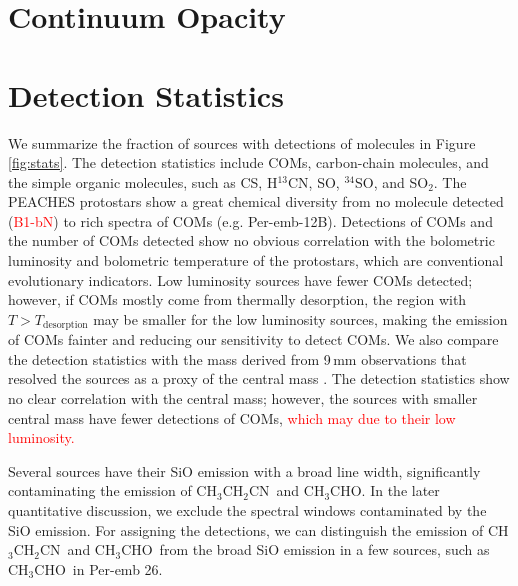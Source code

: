 \documentclass[twocolumn]{aastex62}
\newcommand{\htcn}{\mbox{H$^{13}$CN}}
\newcommand{\acetaldehyde}{\mbox{CH$_{3}$CHO}}
\newcommand{\ethylcyanide}{\mbox{CH$_{3}$CH$_{2}$CN}}
\begin{document}
\section{Continuum Opacity}

\section{Detection Statistics}
We summarize the fraction of sources with detections of molecules in Figure\,\ref{fig:stats}.  The detection statistics include COMs, carbon-chain molecules, and the simple organic molecules, such as CS, \htcn, SO, $^{34}$SO, and SO$_{2}$.  The PEACHES protostars show a great chemical diversity from no molecule detected (\textcolor{red}{B1-bN}) to rich spectra of COMs (e.g. Per-emb-12B).  Detections of COMs and the number of COMs detected show no obvious correlation with the bolometric luminosity and bolometric temperature of the protostars, which are conventional evolutionary indicators.  Low luminosity sources have fewer COMs detected; however, if COMs mostly come from thermally desorption, the region with $T > T_\text{desorption}$ may be smaller for the low luminosity sources, making the emission of COMs fainter and reducing our sensitivity to detect COMs.  We also compare the detection statistics with the mass derived from 9\,mm observations that resolved the sources as a proxy of the central mass \citep{2018ApJS..238...19T}.  The detection statistics show no clear correlation with the central mass; however, the sources with smaller central mass have fewer detections of COMs, \textcolor{red}{which may due to their low luminosity.}  

Several sources have their SiO emission with a broad line width, significantly contaminating the emission of \ethylcyanide\ and \acetaldehyde.  In the later quantitative discussion, we exclude the spectral windows contaminated by the SiO emission.  For assigning the detections, we can distinguish the emission of \ethylcyanide\ and \acetaldehyde\ from the broad SiO emission in a few sources, such as \acetaldehyde\ in Per-emb 26.
\end{document}
